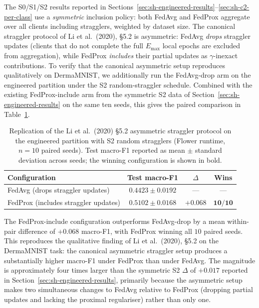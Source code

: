 \documentclass[11pt,a4paper]{report}
\begin{document}
The S0/S1/S2 results reported in
Sections~\ref{sec:sh-engineered-results}--\ref{sec:sh-c2-per-class}
use a \emph{symmetric} inclusion policy: both FedAvg and FedProx
aggregate over all clients including stragglers, weighted by
dataset size. The canonical straggler protocol of
Li et al.\ (2020), §5.2 is asymmetric: FedAvg \emph{drops}
straggler updates (clients that do not complete the full
$E_{\max}$ local epochs are excluded from aggregation), while
FedProx \emph{includes} their partial updates as
$\gamma$-inexact contributions. To verify that the canonical
asymmetric setup reproduces qualitatively on DermaMNIST, we
additionally run the FedAvg-drop arm on the engineered
partition under the S2 random-straggler schedule. Combined with
the existing FedProx-include arm from the symmetric S2 data of
Section~\ref{sec:sh-engineered-results} on the same ten seeds,
this gives the paired comparison in
Table~\ref{tab:sh-asymmetric}.

\begin{table}[!htbp]
\centering
\caption{Replication of the Li et al.\ (2020) §5.2 asymmetric
straggler protocol on the engineered partition with S2 random
stragglers (Flower runtime, $n = 10$ paired seeds). Test
macro-F1 reported as mean $\pm$ standard deviation across
seeds; the winning configuration is shown in bold.}
\label{tab:sh-asymmetric}
\small
\begin{tabular}{lccc}
\toprule
Configuration & Test macro-F1 & $\Delta$ & Wins \\
\midrule
FedAvg (drops straggler updates)         & $0.4423 \pm 0.0192$ & ---       & ---           \\
FedProx (includes straggler updates)     & $\mathbf{0.5102 \pm 0.0168}$ & $\mathbf{+0.068}$ & $\mathbf{10/10}$ \\
\bottomrule
\end{tabular}
\end{table}

The FedProx-include configuration outperforms FedAvg-drop by a
mean within-pair difference of $+0.068$ macro-F1, with FedProx
winning all $10$ paired seeds. This reproduces the qualitative
finding of Li et al.\ (2020), §5.2 on the DermaMNIST task: the
canonical asymmetric straggler setup produces a substantially
higher macro-F1 under FedProx than under FedAvg. The magnitude
is approximately four times larger than the symmetric S2
$\Delta$ of $+0.017$ reported in
Section~\ref{sec:sh-engineered-results}, primarily because the
asymmetric setup makes two simultaneous changes to FedAvg
relative to FedProx (dropping partial updates and lacking the
proximal regulariser) rather than only one.
\end{document}
